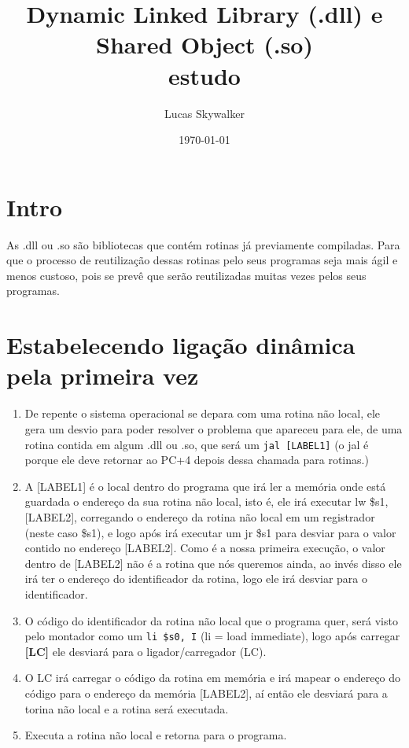 \documentclass{article}
\author {
  Lucas Skywalker
}
\title {
  Dynamic Linked Library (.dll) e Shared Object (.so)\\
  {
    \small estudo
  }
}
\date{\today}
\begin{document}
\maketitle

\section{Intro}
As .dll ou .so são bibliotecas que contém rotinas já previamente compiladas.
Para que o processo de reutilização dessas rotinas pelo seus programas seja mais
ágil e menos custoso, pois se prevê que serão reutilizadas muitas vezes pelos
seus programas.

\section{Estabelecendo ligação dinâmica pela primeira vez}

  \begin{enumerate}
    \item De repente o sistema operacional se depara com uma rotina não local,
    ele gera um desvio para poder resolver o problema que apareceu para ele, de
    uma rotina contida em algum .dll ou .so, que será um \verb|jal [LABEL1]| (o
    jal é porque ele deve retornar ao PC+4 depois dessa chamada para rotinas.)

    \item A [LABEL1] é o local dentro do programa que irá ler a memória onde
    está guardada o endereço da sua rotina não local, isto é, ele irá executar
    lw \$s1, [LABEL2], corregando o endereço da rotina não local em um
    registrador (neste caso \$s1), e logo após irá executar um jr \$s1 para
    desviar para o valor contido no endereço [LABEL2]. Como é a nossa primeira
    execução, o valor dentro de [LABEL2] não é a rotina que nós queremos ainda,
    ao invés disso ele irá ter o endereço do identificador da rotina, logo ele
    irá desviar para o identificador.

    \item O código do identificador da rotina não local que o programa quer,
    será visto pelo montador como um \verb|li $s0, I| (li = load immediate),
    logo após carregar \textbf{[LC]} ele desviará para o ligador/carregador
    (LC).

    \item O LC irá carregar o código da rotina em memória e irá mapear o
    endereço do código para o endereço da memória [LABEL2], aí então ele
    desviará para a torina não local e a rotina será executada.

    \item Executa a rotina não local e retorna para o programa.
  \end{enumerate}
\end{document}
